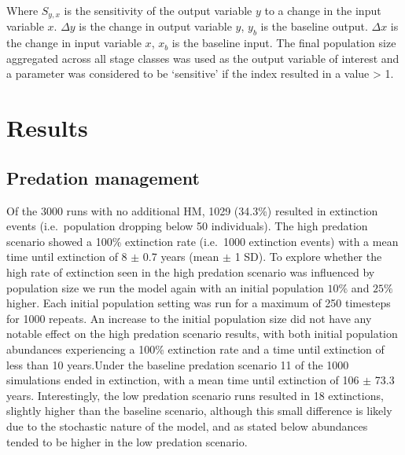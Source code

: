 \documentclass[11pt,]{article}
\begin{document}
Where \(S_{y,x}\) is the sensitivity of the output variable \(y\) to a
change in the input variable \(x\). \(\Delta y\) is the change in output
variable \(y\), \(y_b\) is the baseline output. \(\Delta x\) is the
change in input variable \(x\), \(x_b\) is the baseline input. The final
population size aggregated across all stage classes was used as the
output variable of interest and a parameter was considered to be
`sensitive' if the index resulted in a value \textgreater{} 1.

\hypertarget{results}{%
\section{Results}\label{results}}

\hypertarget{predation-management}{%
\subsection{Predation management}\label{predation-management}}

Of the 3000 runs with no additional HM, 1029 (34.3\%) resulted in
extinction events (i.e.~population dropping below 50 individuals). The
high predation scenario showed a 100\% extinction rate (i.e.~1000
extinction events) with a mean time until extinction of 8 \(\pm\) 0.7
years (mean \(\pm\) 1 SD). To explore whether the high rate of
extinction seen in the high predation scenario was influenced by
population size we run the model again with an initial population
\(10 \%\) and \(25 \%\) higher. Each initial population setting was run
for a maximum of 250 timesteps for 1000 repeats. An increase to the
initial population size did not have any notable effect on the high
predation scenario results, with both initial population abundances
experiencing a 100\% extinction rate and a time until extinction of less
than 10 years.Under the baseline predation scenario 11 of the 1000
simulations ended in extinction, with a mean time until extinction of
106 \(\pm\) 73.3 years. Interestingly, the low predation scenario runs
resulted in 18 extinctions, slightly higher than the baseline scenario,
although this small difference is likely due to the stochastic nature of
the model, and as stated below abundances tended to be higher in the low
predation scenario.
\end{document}
